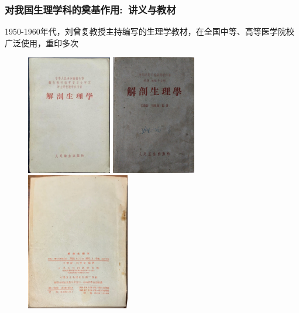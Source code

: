 \frame
{
	\frametitle{对我国生理学科的奠基作用:~讲义与教材}
	\textrm{1950-1960}年代，刘曾复教授主持编写的生理学教材，在全国中等、高等医学院校广泛使用，重印多次
\begin{figure}[h!] 
\centering
\vspace{-0.05in}
\includegraphics[height=0.45\textwidth,width=0.33\textwidth,clip]{Figures_Peking-Opera/Liu-Anatomy_and_Physiology-1.jpg}
\includegraphics[height=0.45\textwidth,width=0.33\textwidth,clip]{Figures_Peking-Opera/Liu-Anatomy_and_Physiology-3.jpg}
\includegraphics[height=0.18\textwidth,width=0.40\textwidth,viewport=0 70 1071 630,clip]{Figures_Peking-Opera/Liu-Anatomy_and_Physiology-2.jpg}
\label{Liu-Anatomy_and_Physiology-middle}
\end{figure}
}

